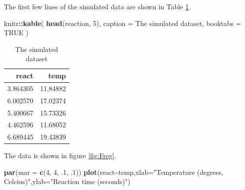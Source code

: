 \documentclass[
]{book}
\newenvironment{Shaded}{\begin{snugshade}}{\end{snugshade}}
\newcommand{\AttributeTok}[1]{\textcolor[rgb]{0.13,0.29,0.53}{#1}}
\newcommand{\ConstantTok}[1]{\textcolor[rgb]{0.56,0.35,0.01}{#1}}
\newcommand{\DecValTok}[1]{\textcolor[rgb]{0.00,0.00,0.81}{#1}}
\newcommand{\FunctionTok}[1]{\textcolor[rgb]{0.13,0.29,0.53}{\textbf{#1}}}
\newcommand{\NormalTok}[1]{#1}
\newcommand{\SpecialCharTok}[1]{\textcolor[rgb]{0.81,0.36,0.00}{\textbf{#1}}}
\newcommand{\StringTok}[1]{\textcolor[rgb]{0.31,0.60,0.02}{#1}}
\begin{document}
The first few lines of the simulated data are shown in Table \ref{tab:Ttab1}.

\begin{Shaded}
\begin{Highlighting}[]
\NormalTok{knitr}\SpecialCharTok{::}\FunctionTok{kable}\NormalTok{(}
  \FunctionTok{head}\NormalTok{(reaction, }\DecValTok{5}\NormalTok{), }\AttributeTok{caption =} \StringTok{\textquotesingle{}The simulated dataset\textquotesingle{}}\NormalTok{,}
  \AttributeTok{booktabs =} \ConstantTok{TRUE}
\NormalTok{)}
\end{Highlighting}
\end{Shaded}

\begin{table}

\caption{\label{tab:Ttab1}The simulated dataset}
\centering
\begin{tabular}[t]{rr}
\toprule
react & temp\\
\midrule
3.864305 & 11.84882\\
6.002570 & 17.02374\\
5.400667 & 15.73326\\
4.462596 & 11.68052\\
6.689445 & 19.43839\\
\bottomrule
\end{tabular}
\end{table}

The data is shown in figure \ref{fig:Freg}.

\begin{Shaded}
\begin{Highlighting}[]
\FunctionTok{par}\NormalTok{(}\AttributeTok{mar =} \FunctionTok{c}\NormalTok{(}\DecValTok{4}\NormalTok{, }\DecValTok{4}\NormalTok{, .}\DecValTok{1}\NormalTok{, .}\DecValTok{1}\NormalTok{))}
\FunctionTok{plot}\NormalTok{(react}\SpecialCharTok{\textasciitilde{}}\NormalTok{temp,}\AttributeTok{xlab=}\StringTok{"Temperature (degrees, Celcius)"}\NormalTok{,}\AttributeTok{ylab=}\StringTok{"Reaction time (seconds)"}\NormalTok{)}
\end{Highlighting}
\end{Shaded}
\end{document}
